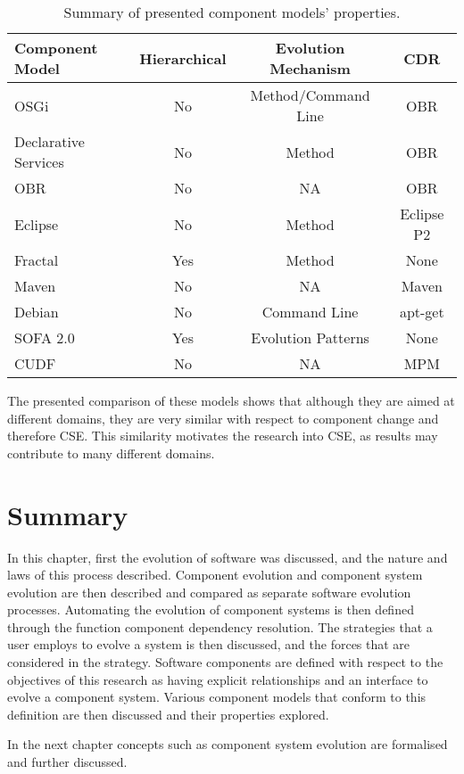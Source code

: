 \begin{table}
\begin{tabular}{|l || c | c | c | }
\hline \textbf{Component Model}& \textbf{Hierarchical}& \textbf{Evolution Mechanism}	& \textbf{CDR}\\\hline

OSGi					& No			& Method/Command Line 					& OBR\\
Declarative Services	& No			& Method 								& OBR\\
OBR						& No			& NA									& OBR \\
Eclipse					& No			& Method								& Eclipse P2\\
Fractal					& Yes			& Method 								& None\\
Maven					& No			& NA 									& Maven\\
Debian					& No			& Command Line 							& apt-get\\
SOFA 2.0				& Yes			& Evolution Patterns 					& None\\
CUDF					& No			& NA 									& MPM\\\hline
\end{tabular}
\caption{Summary of presented component models' properties.}
\label{background.comparisonprop}
\end{table}

The presented comparison of these models shows that although they are aimed at different domains, they are very similar with respect to component change and therefore CSE.
This similarity motivates the research into CSE, as results may contribute to many different domains. 

\section{Summary}
In this chapter, first the evolution of software was discussed, and the nature and laws of this process described.
Component evolution and component system evolution are then described and compared as separate software evolution processes.
Automating the evolution of component systems is then defined through the function component dependency resolution.
The strategies that a user employs to evolve a system is then discussed, and the forces that are considered in the strategy.
Software components are defined with respect to the objectives of this research as having explicit relationships and an interface to evolve a component system.
Various component models that conform to this definition are then discussed and their properties explored.

In the next chapter concepts such as component system evolution are formalised and further discussed.  

